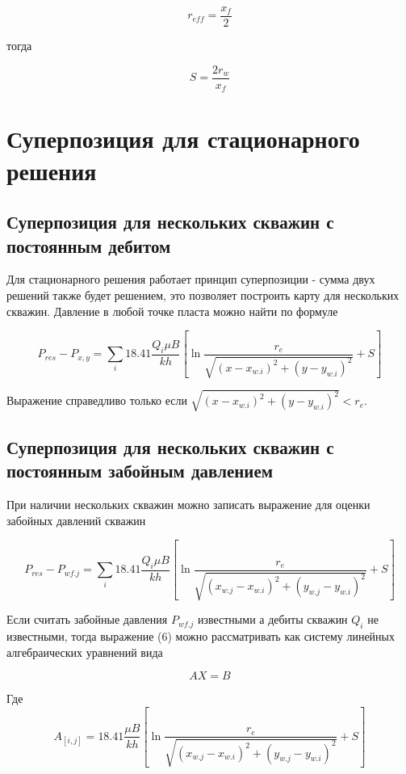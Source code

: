 \begin{equation}
	r_{eff} = \frac{x_f}{2}
\end{equation}

тогда 

\begin{equation}
	S = \frac{2r_w}{x_f}
\end{equation}




\section{Суперпозиция для стационарного решения}

\subsection{Суперпозиция для нескольких скважин с постоянным дебитом} 

Для стационарного решения работает принцип суперпозиции - сумма двух решений также будет решением, это позволяет построить карту для нескольких скважин.
Давление в любой точке пласта можно найти по формуле

\begin{equation}
	P_{res} - P_{x,y} =  \sum_{i} 18.41\dfrac{ Q_i\mu B }{kh} \left[ \ln\frac{r_e}{\sqrt{ (x-x_{w.i})^2 + (y-y_{w.i})^2 }} +S \right]
\end{equation}

Выражение справедливо только если $\sqrt{ (x-x_{w.i})^2 + (y-y_{w.i})^2 }< r_e$.

\subsection{Суперпозиция для нескольких скважин с постоянным забойным давлением}

При наличии нескольких скважин можно записать выражение для оценки забойных давлений скважин


$$
P_{res} - P_{wf.j} =  \sum_{i} 18.41\dfrac{ Q_i\mu B }{kh} \left[ \ln\dfrac{r_e}{\sqrt{ (x_{w.j}-x_{w.i})^2 + (y_{w.j}-y_{w.i})^2 }} +S \right]
$$

Если считать забойные давления $P_{wf.j}$ известными а дебиты скважин $Q_i$ не известными, тогда выражение (6) можно рассматривать как систему линейных алгебраических уравнений вида

$$AX = B$$

Где
$$
A_{[i,j]} = 18.41\dfrac{ \mu B }{kh} \left[ \ln\dfrac{r_e}{\sqrt{ (x_{w.j}-x_{w.i})^2 + (y_{w.j}-y_{w.i})^2 }} +S \right]
$$

